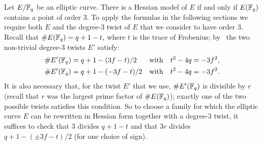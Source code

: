 Let $E/\mathbb{F}_{q}$ be an elliptic curve. There is a Hessian model of $E$ if and only if $E(\mathbb{F}_{q})$ contains a point of order 3. 
To apply the formulas in the following sections we require both $E$ and the 
degree-3 twist of $E$ that we consider to have order 3.
Recall that
$\#E(\mathbb{F}_{q}) = q+1-t,$
where $t$ is the trace of Frobenius; 
by~\cite{2006/hess} the two non-trivial degree-3 twists $E'$ satisfy:
\begin{align*}
\# E' (\mathbb{F}_{q}) &= q + 1 - (3f - t) / 2 & \text{with} & \quad t^2 - 4q = -3f^2, \\
\# E' (\mathbb{F}_{q}) &= q + 1 - (-3f- t) / 2 & \text{with} & \quad t^2 - 4q = -3f^2.
\end{align*}
It is also necessary that, for the twist $E'$ that we use, $\#E'(\mathbb{F}_{q})$ is divisible by $r$ (recall that $r$ was the largest prime factor of $\# E(\mathbb{F}_{q})$); exactly one of the two possible twists satisfies this condition.
So to choose a family for which the elliptic curve $E$ can be rewritten in Hessian form together with a degree-3 twist, it suffices to check that 3 divides $q+1-t$ and that $3r$ divides $q + 1 - (\pm 3f - t) / 2$ (for one choice of sign).



